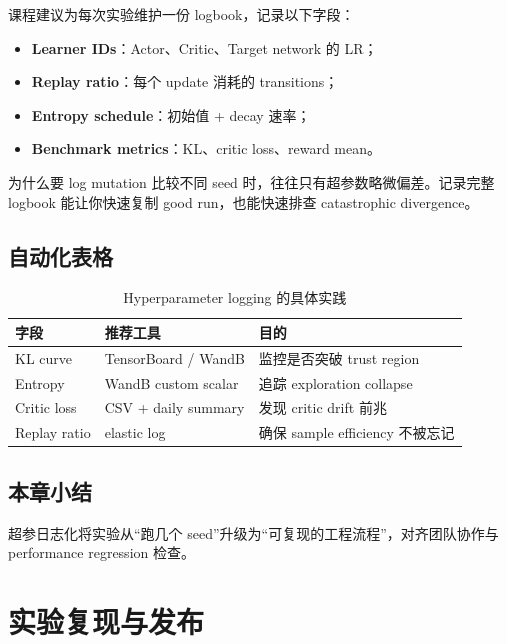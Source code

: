 \documentclass[a4paper]{article}
\begin{document}
课程建议为每次实验维护一份 logbook，记录以下字段：

\begin{itemize}
    \item \textbf{Learner IDs}：Actor、Critic、Target network 的 LR；
    \item \textbf{Replay ratio}：每个 update 消耗的 transitions；
    \item \textbf{Entropy schedule}：初始值 + decay 速率；
    \item \textbf{Benchmark metrics}：KL、critic loss、reward mean。
\end{itemize}

\begin{importantbox}{为什么要 log mutation}
比较不同 seed 时，往往只有超参数略微偏差。记录完整 logbook 能让你快速复制 good run，也能快速排查 catastrophic divergence。
\end{importantbox}

\subsection{自动化表格}

\begin{table}[H]
\centering
\begin{tabular}{p{}p{}p{}}
\toprule
字段 & 推荐工具 & 目的 \\
\midrule
KL curve & TensorBoard / WandB & 监控是否突破 trust region \\
Entropy & WandB custom scalar & 追踪 exploration collapse \\
Critic loss & CSV + daily summary & 发现 critic drift 前兆 \\
Replay ratio & elastic log & 确保 sample efficiency 不被忘记 \\
\bottomrule
\end{tabular}
\caption{Hyperparameter logging 的具体实践}
\end{table}

\subsection{本章小结}

超参日志化将实验从“跑几个 seed”升级为“可复现的工程流程”，对齐团队协作与 performance regression 检查。

\section{实验复现与发布}
\end{document}
